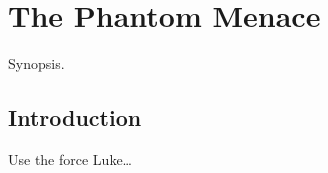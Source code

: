 \chapter{The Phantom Menace}\label{chapter:phantom-menace}


\begin{synopsis}

Synopsis.

\end{synopsis}

\section{Introduction}\label{introduction}

Use the force Luke\ldots{}
